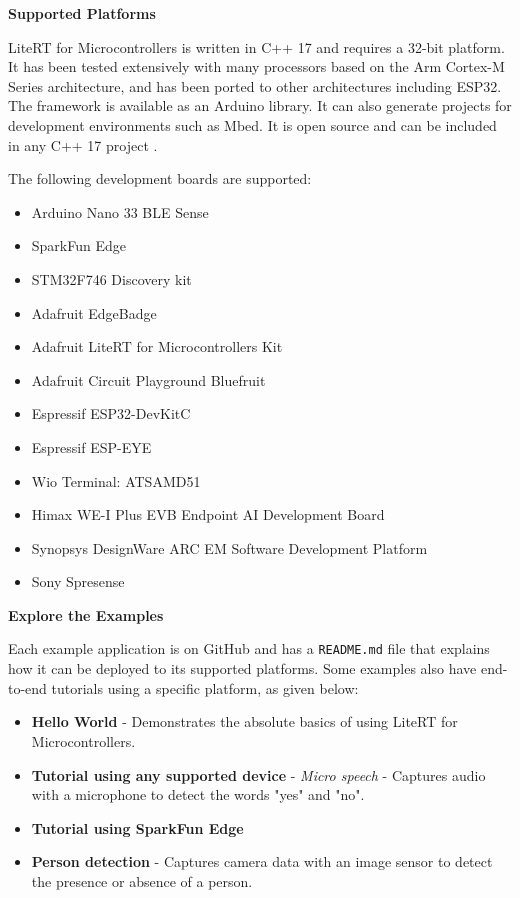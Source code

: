 \textbf{Supported Platforms}

LiteRT for Microcontrollers is written in C++ 17 and requires a 32-bit platform. It has been tested extensively with many processors based on the Arm Cortex-M Series architecture, and has been ported to other architectures including ESP32. The framework is available as an Arduino library. It can also generate projects for development environments such as Mbed. It is open source and can be included in any C++ 17 project \cite{Tensorflowlite:2024}.

The following development boards are supported:

\begin{itemize}
	\item Arduino Nano 33 BLE Sense
	\item SparkFun Edge
	\item STM32F746 Discovery kit
	\item Adafruit EdgeBadge
	\item Adafruit LiteRT for Microcontrollers Kit
	\item Adafruit Circuit Playground Bluefruit
	\item Espressif ESP32-DevKitC
	\item Espressif ESP-EYE
	\item Wio Terminal: ATSAMD51
	\item Himax WE-I Plus EVB Endpoint AI Development Board
	\item Synopsys DesignWare ARC EM Software Development Platform
	\item Sony Spresense
\end{itemize}

\textbf{Explore the Examples}

Each example application is on GitHub and has a \texttt{README.md} file that explains how it can be deployed to its supported platforms. Some examples also have end-to-end tutorials using a specific platform, as given below:

\begin{itemize}
	\item \textbf{Hello World} - Demonstrates the absolute basics of using LiteRT for Microcontrollers.
	\item \textbf{Tutorial using any supported device} - \textit{Micro speech} - Captures audio with a microphone to detect the words "yes" and "no".
	\item \textbf{Tutorial using SparkFun Edge}
	\item \textbf{Person detection} - Captures camera data with an image sensor to detect the presence or absence of a person.
\end{itemize}

